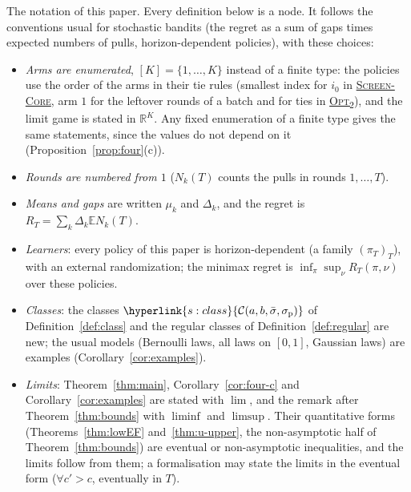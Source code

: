 \documentclass[11pt]{article}
\DeclareRobustCommand{\sy}[2]{{\hyperlink{#1}{#2}}}
\newcommand{\R}{\mathbb{R}}
\newcommand{\E}{\mathbb{E}}
\newcommand{\1}{\mathbf{1}}
\newcommand{\Cab}{\sy{s:class}{\mathcal C(a,b,\bar\sigma,\sigma_{\mathrm p})}}
\newcommand{\SC}{\sy{alg:sc}{\textsc{Screen-Core}}}
\newcommand{\OPT}{\sy{alg:opt}{\textsc{Opt}\textsubscript{2}}}
\begin{document}
The notation of this paper. Every definition below is a node. It follows the conventions usual for stochastic bandits (the regret as a sum of gaps
times expected numbers of pulls, horizon-dependent policies), with these choices:
\begin{itemize}
\item \emph{Arms are enumerated}, $[K]=\{1,\dots,K\}$ instead of a finite type: the policies use the order of the arms in their tie rules (smallest index for $i_0$ in
\SC, arm $1$ for the leftover rounds of a batch and for ties in \OPT), and the limit game is stated in $\R^K$. Any fixed enumeration of a finite type gives
the same statements, since the values do not depend on it (Proposition~\ref{prop:four}(c)).
\item \emph{Rounds are numbered from $1$} ($N_k(T)$ counts the pulls in rounds $1,\dots,T$).
\item \emph{Means and gaps} are written $\mu_k$ and $\Delta_k$, and the regret is $R_T=\sum_k\Delta_k\E N_k(T)$.
\item \emph{Learners}: every policy of this paper is horizon-dependent (a family $(\pi_T)_T$), with an external randomization; the
minimax regret is $\inf_\pi\sup_\nu R_T(\pi,\nu)$ over these policies.
\item \emph{Classes}: the classes $\Cab$ of Definition~\ref{def:class} and the regular classes of Definition~\ref{def:regular} are new; the usual models
(Bernoulli laws, all laws on $[0,1]$, Gaussian laws) are examples (Corollary~\ref{cor:examples}).
\item \emph{Limits}: Theorem~\ref{thm:main}, Corollary~\ref{cor:four-c} and Corollary~\ref{cor:examples} are stated with $\lim$, and the remark after
Theorem~\ref{thm:bounds} with $\liminf$ and $\limsup$. Their quantitative forms (Theorems~\ref{thm:lowEF} and~\ref{thm:u-upper}, the non-asymptotic half
of Theorem~\ref{thm:bounds}) are eventual or non-asymptotic inequalities, and the limits follow from them; a formalisation may state the limits in
the eventual form ($\forall c'>c$, eventually in $T$).
\end{itemize}
\end{document}
